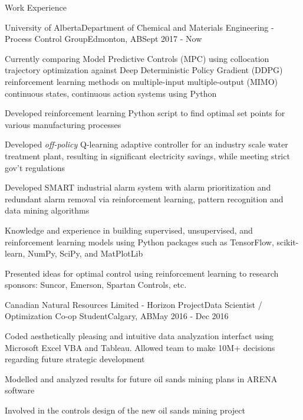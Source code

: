 \documentclass{article}
\newlength{\tabin}
\newlength{\secsep}
\newcommand{\lineunder}{\vspace*{-8pt} \\ \hspace*{-6pt} \hrulefill \\ \vspace*{-15pt}}
\newenvironment{tabbedsection}[1]{
  \begin{list}{}{
      \setlength{\itemsep}{0pt}
      \setlength{\labelsep}{0pt}
      \setlength{\labelwidth}{0pt}
      \setlength{\leftmargin}{\tabin}
      \setlength{\rightmargin}{\tabin}
      \setlength{\listparindent}{0pt}
      \setlength{\parsep}{0pt}
      \setlength{\parskip}{0pt}
      \setlength{\partopsep}{0pt}
      \setlength{\topsep}{#1}
    }
  \item[]
}{\end{list}}
\newenvironment{resume_section}[1]{
  \filbreak
  \vspace{2\secsep}
  \textsc{\large#1}
  \lineunder
  \begin{tabbedsection}{\secsep}
}{\end{tabbedsection}}
\newenvironment{subitems}{
  \renewcommand{\labelitemi}{-}
  \begin{itemize}
      \setlength{\labelsep}{1em}
}{\end{itemize}}
\newenvironment{resume_employer}[4]{
  \vspace{\secsep}
  \textbf{#1} \\ 
  \indent {\small #2} \hfill {\footnotesize#3 (#4)}
  \begin{tabbedsection}{0pt}
  \begin{subitems}
}{\end{subitems}\end{tabbedsection}}
\begin{document}
\begin{resume_section}{Work Experience}

  \begin{resume_employer}{University of Alberta}{Department of Chemical and Materials Engineering - Process Control Group}{Edmonton, AB}{Sept 2017 - Now}
    \item Currently comparing Model Predictive Controls (MPC) using collocation trajectory optimization against Deep Deterministic Policy Gradient (DDPG) reinforcement learning methods on multiple-input multiple-output (MIMO) continuous states, continuous action systems using Python
    \item Developed reinforcement learning Python script to find optimal set points for various manufacturing processes
    \item Developed \textit{off-policy} Q-learning adaptive controller for an industry scale water treatment plant, resulting in significant electricity savings, while meeting strict gov’t regulations
    \item Developed SMART industrial alarm system with alarm prioritization and redundant alarm removal via reinforcement learning, pattern recognition and data mining algorithms
    \item Knowledge and experience in building supervised, unsupervised, and reinforcement learning models using Python packages such as TensorFlow, scikit-learn, NumPy, SciPy, and MatPlotLib
    \item Presented ideas for optimal control using reinforcement learning to research sponsors: Suncor, Emerson, Spartan Controls, etc.
  \end{resume_employer}
  
  \begin{resume_employer}{Canadian Natural Resources Limited - Horizon Project}{Data Scientist / Optimization Co-op Student}{Calgary, AB}{May 2016 - Dec 2016}
    \item Coded aesthetically pleasing and intuitive data analyzation interfact using Microsoft Excel VBA and Tableau.  Allowed team to make 10M+ decisions regarding future strategic development
    \item Modelled and analyzed results for future oil sands mining plans in ARENA software
	\item Involved in the controls design of the new oil sands mining project
  \end{resume_employer}
  

\end{resume_section}
\end{document}
